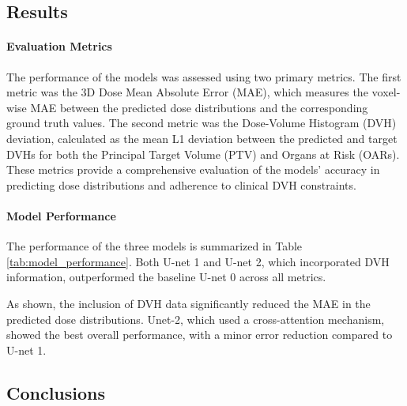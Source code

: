 \subsection{Results}

\paragraph{Evaluation Metrics}  
The performance of the models was assessed using two primary metrics.
The first metric was the 3D Dose Mean Absolute Error (MAE), which measures the voxel-wise MAE between the predicted dose distributions and the corresponding ground truth values.
The second metric was the Dose-Volume Histogram (DVH) deviation, calculated as the mean L1 deviation between the predicted and target DVHs for both the Principal Target Volume (PTV) and Organs at Risk (OARs).
These metrics provide a comprehensive evaluation of the models' accuracy in predicting dose distributions and adherence to clinical DVH constraints.

\paragraph{Model Performance}
The performance of the three models is summarized in Table \ref{tab:model_performance}.
Both U-net 1 and U-net 2, which incorporated DVH information, outperformed the baseline U-net 0 across all metrics.

As shown, the inclusion of DVH data significantly reduced the MAE in the predicted dose distributions.
Unet-2, which used a cross-attention mechanism, showed the best overall performance, with a minor error reduction compared to U-net 1.
%
%

\subsection{Conclusions}
